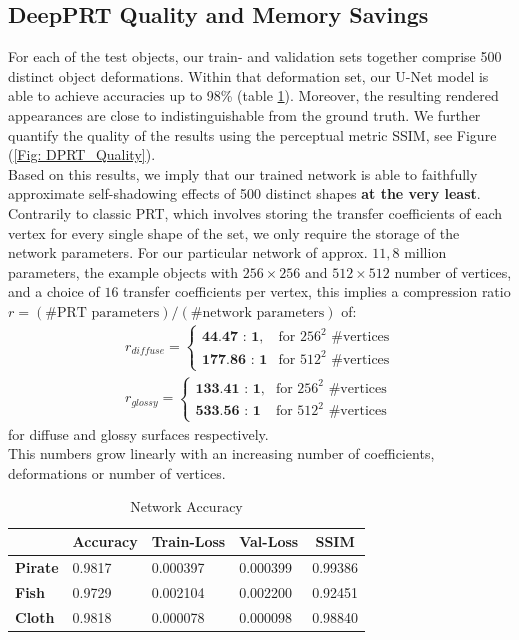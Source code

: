 \subsection*{DeepPRT Quality and Memory Savings} \label{Sec: memory_savings}
For each of the test objects, our train- and validation sets together comprise 500 distinct object deformations. 
Within that deformation set, our U-Net model is able to achieve accuracies up to 98\% (table \ref{Table: NN_Accuracy}). Moreover, the resulting rendered appearances are close to indistinguishable from the ground truth. We further quantify the quality of the results using the perceptual metric SSIM, see Figure (\ref{Fig: DPRT_Quality}). 
\\
Based on this results, we imply that our trained network is able to faithfully approximate self-shadowing effects of 500 distinct shapes \textbf{at the very least}. Contrarily to classic PRT, which involves storing the transfer coefficients of each vertex for every single shape of the set, we only require the storage of the network parameters.
For our particular network of approx. $11,8$ million parameters,  the example objects with $256 \times 256$ and $512 \times 512$ number of vertices, and  a choice of $16$ transfer coefficients per vertex, this implies a compression ratio $r = (\text{\# PRT parameters})/(\text{\# network parameters})$ of: 
\begin{align*}
r_{diffuse} = 
\begin{cases}
\textbf{44.47 : 1} , & \mbox{for } 256^2 \mbox{ \#vertices} \\
\textbf{177.86 : 1} & \mbox{for } 512^2 \mbox{ \#vertices}
\end{cases}
\\
r_{glossy} = 
\begin{cases}
\textbf{133.41 : 1} , & \mbox{for } 256^2 \mbox{ \#vertices} \\
\textbf{533.56 : 1} & \mbox{for } 512^2 \mbox{ \#vertices}
\end{cases}
\end{align*}
for diffuse and glossy surfaces respectively.\\
This numbers grow linearly with an increasing number of coefficients, deformations or number of vertices. 
\begin{table}[h]
\begin{tabular}{|l|l|l|l|l|}
\hline
\textbf{}            & \textbf{Accuracy} & \textbf{Train-Loss} & \textbf{Val-Loss} & \multicolumn{1}{c|}{\textbf{SSIM}} \\ \hline
\textbf{Pirate} & 0.9817            & 0.000397            & 0.000399                 & 0.99386                      \\ \hline
\textbf{Fish}        & 0.9729            & 0.002104            & 0.002200                      &  0.92451                   \\ \hline
\textbf{Cloth}       & 0.9818            & 0.000078            & 0.000098                 & 0.98840                      \\ \hline
\end{tabular}
\caption{Network Accuracy}
\label{Table: NN_Accuracy}
\end{table}
